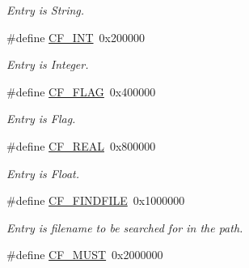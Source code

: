 \begin{DoxyCompactItemize}
\begin{DoxyCompactList}\small\item\em Entry is String. \end{DoxyCompactList}\item 
\hypertarget{group__special__options__mask_gab33869d596619ad14675c053925a42e0}{\#define \hyperlink{group__special__options__mask_gab33869d596619ad14675c053925a42e0}{C\-F\-\_\-\-I\-N\-T}~0x200000}\label{group__special__options__mask_gab33869d596619ad14675c053925a42e0}

\begin{DoxyCompactList}\small\item\em Entry is Integer. \end{DoxyCompactList}\item 
\hypertarget{group__special__options__mask_ga1d1f1d1b6eac6b5d9970102318ab2667}{\#define \hyperlink{group__special__options__mask_ga1d1f1d1b6eac6b5d9970102318ab2667}{C\-F\-\_\-\-F\-L\-A\-G}~0x400000}\label{group__special__options__mask_ga1d1f1d1b6eac6b5d9970102318ab2667}

\begin{DoxyCompactList}\small\item\em Entry is Flag. \end{DoxyCompactList}\item 
\hypertarget{group__special__options__mask_gaeefdbef320cbd7179f1fb0ebe0fcf5ce}{\#define \hyperlink{group__special__options__mask_gaeefdbef320cbd7179f1fb0ebe0fcf5ce}{C\-F\-\_\-\-R\-E\-A\-L}~0x800000}\label{group__special__options__mask_gaeefdbef320cbd7179f1fb0ebe0fcf5ce}

\begin{DoxyCompactList}\small\item\em Entry is Float. \end{DoxyCompactList}\item 
\hypertarget{group__special__options__mask_ga675b6f8440beecc09fec54d17e9c3ee9}{\#define \hyperlink{group__special__options__mask_ga675b6f8440beecc09fec54d17e9c3ee9}{C\-F\-\_\-\-F\-I\-N\-D\-F\-I\-L\-E}~0x1000000}\label{group__special__options__mask_ga675b6f8440beecc09fec54d17e9c3ee9}

\begin{DoxyCompactList}\small\item\em Entry is filename to be searched for in the path. \end{DoxyCompactList}\item 
\hypertarget{group__special__options__mask_ga3229f5b038eaa0c6428361d2aa510dfc}{\#define \hyperlink{group__special__options__mask_ga3229f5b038eaa0c6428361d2aa510dfc}{C\-F\-\_\-\-M\-U\-S\-T}~0x2000000}\label{group__special__options__mask_ga3229f5b038eaa0c6428361d2aa510dfc}


\end{DoxyCompactItemize}
